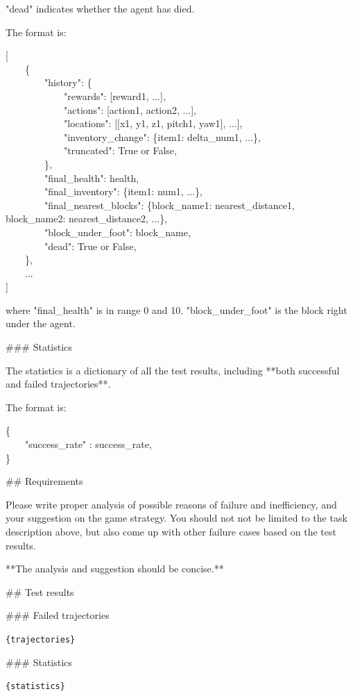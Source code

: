 "dead" indicates whether the agent has died.



The format is:

[
\\
\hbox{\ \ \ \ }\{\\
\hbox{\ \ \ \ \ \ \ \ }"history": \{\\
\hbox{\ \ \ \ \ \ \ \ \ \ \ \ }"rewards": [reward1, ...],\\
\hbox{\ \ \ \ \ \ \ \ \ \ \ \ }"actions": [action1, action2, ...],\\
\hbox{\ \ \ \ \ \ \ \ \ \ \ \ }"locations": [[x1, y1, z1, pitch1, yaw1], ...],\\
\hbox{\ \ \ \ \ \ \ \ \ \ \ \ }"inventory\_change": \{item1: delta\_num1, ...\},\\
\hbox{\ \ \ \ \ \ \ \ \ \ \ \ }"truncated": True or False,\\
\hbox{\ \ \ \ \ \ \ \ }\},\\
\hbox{\ \ \ \ \ \ \ \ }"final\_health": health,\\
\hbox{\ \ \ \ \ \ \ \ }"final\_inventory": \{item1: num1, ...\},\\
\hbox{\ \ \ \ \ \ \ \ }"final\_nearest\_blocks": \{block\_name1: nearest\_distance1, block\_name2: nearest\_distance2, ...\},\\
\hbox{\ \ \ \ \ \ \ \ }"block\_under\_foot": block\_name,\\
\hbox{\ \ \ \ \ \ \ \ }"dead": True or False,\\
\hbox{\ \ \ \ }\},\\
\hbox{\ \ \ \ }...\\
]



where "final\_health" is in range 0 and 10. "block\_under\_foot" is the block right under the agent.



\#\#\# Statistics

The statistics is a dictionary of all the test results, including **both successful and failed trajectories**.



The format is:

\{
\\
\hbox{\ \ \ \ }"success\_rate" : success\_rate,\\
\}





\#\# Requirements

Please write proper analysis of possible reasons of failure and inefficiency, and your suggestion on the game strategy. You should not not be limited to the task description above, but also come up with other failure cases based on the test results.

**The analysis and suggestion should be concise.**



\#\# Test results

\#\#\# Failed trajectories

\texttt{\{trajectories\}}



\#\#\# Statistics

\texttt{\{statistics\}}


